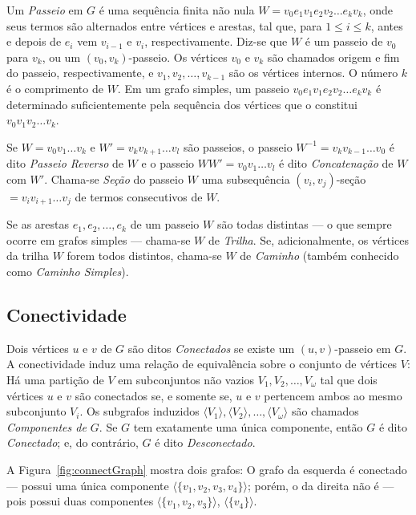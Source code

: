 Um \textit{Passeio} em $G$ é uma sequência finita não nula $W = v_0e_1v_1e_2v_2\dots e_kv_k$, onde seus termos são alternados entre vértices e arestas, tal que, para $1\leq i \leq k$, antes e depois de $e_i$ vem $v_{i-1}$ e $v_i$, respectivamente. Diz-se que $W$ é um passeio de $v_0$ para $v_k$, ou um $(v_0,v_k)$-passeio. Os vértices $v_0$ e $v_k$ são chamados origem e fim do passeio, respectivamente, e $v_1,v_2,\dots,v_{k-1}$ são os vértices internos. O número $k$ é o comprimento de $W$. 
Em um grafo simples, um passeio $v_0e_1v_1e_2v_2\dots e_kv_k$ é determinado suficientemente pela sequência dos vértices que o constitui $v_0v_1v_2\dots v_k$.

Se $W=v_0v_1\dots v_k$ e $W' = v_kv_{k+1}\dots v_l$ são passeios, o passeio $W^{-1} = v_kv_{k-1}\dots v_0$ é dito \textit{Passeio Reverso} de $W$ e o passeio $WW' = v_0v_1\dots v_l$ é dito \textit{Concatenação} de $W$ com $W'$. Chama-se \textit{Seção} do passeio $W$ uma subsequência $(v_i,v_j)$-seção $= v_iv_{i+1}\dots v_j$ de termos consecutivos de $W$. 

Se as arestas $e_1,e_2,\dots,e_k$ de um passeio $W$ são todas distintas --- o que sempre ocorre em grafos simples --- chama-se $W$ de \textit{Trilha}.  Se, adicionalmente, os vértices da trilha $W$ forem todos distintos, chama-se $W$ de \textit{Caminho} (também conhecido como \textit{Caminho Simples}).

\subsection{Conectividade}

Dois vértices $u$ e $v$ de $G$ são ditos \textit{Conectados} se existe um $(u,v)$-passeio em $G$. A conectividade induz uma relação de equivalência sobre o conjunto de vértices $V$: Há uma partição de $V$ em subconjuntos não vazios $V_1, V_2, \dots, V_\omega$ tal que dois vértices $u$ e $v$ são conectados se, e somente se, $u$ e $v$ pertencem ambos ao mesmo subconjunto $V_i$. Os subgrafos induzidos $\langle V_1\rangle, \langle V_2\rangle, \dots,\langle V_\omega\rangle$ são chamados \textit{Componentes de $G$}. Se $G$ tem exatamente uma única componente, então $G$ é dito \textit{Conectado}; e, do contrário, $G$ é dito \textit{Desconectado}. 

A Figura~\ref{fig:connectGraph} mostra dois grafos: O grafo da esquerda é conectado --- possui uma única componente $\langle \{v_1,v_2,v_3,v_4\}\rangle$; porém, o da direita não é --- pois possui duas componentes $\langle \{v_1,v_2,v_3\}\rangle$, $\langle \{v_4\}\rangle$.

